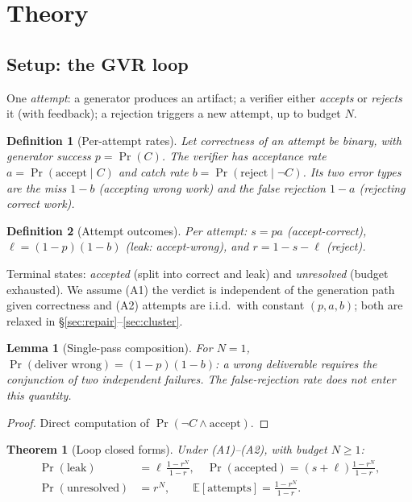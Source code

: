 \documentclass[11pt]{article}
\newtheorem{theorem}{Theorem}
\newtheorem{lemma}{Lemma}
\newtheorem{definition}{Definition}
\begin{document}
\section{Theory}\label{sec:theory}

\subsection{Setup: the GVR loop}\label{sec:setup}

One \emph{attempt}: a generator produces an artifact; a verifier
either \emph{accepts} or \emph{rejects} it (with feedback); a
rejection triggers a new attempt, up to budget $N$.

\begin{definition}[Per-attempt rates]\label{def:rates}
Let correctness of an attempt be binary, with generator success
$p = \Pr(C)$.  The verifier has acceptance rate
$a = \Pr(\text{accept} \mid C)$ and catch rate
$b = \Pr(\text{reject} \mid \neg C)$.  Its two error types are the
\emph{miss} $1-b$ (accepting wrong work) and the \emph{false
rejection} $1-a$ (rejecting correct work).
\end{definition}

\begin{definition}[Attempt outcomes]\label{def:outcomes}
Per attempt: $s = pa$ (accept-correct),
$\ell = (1-p)(1-b)$ (\emph{leak}: accept-wrong), and
$r = 1 - s - \ell$ (reject).
\end{definition}

Terminal states: \emph{accepted} (split into correct and leak) and
\emph{unresolved} (budget exhausted).  We assume (A1) the verdict is
independent of the generation path given correctness and (A2)
attempts are i.i.d.\ with constant $(p,a,b)$; both are relaxed in
§\ref{sec:repair}--\ref{sec:cluster}.

\begin{lemma}[Single-pass composition]\label{lem:single}
For $N=1$, $\Pr(\text{deliver wrong}) = (1-p)(1-b)$: a wrong
deliverable requires the conjunction of two independent failures.
The false-rejection rate does not enter this quantity.
\end{lemma}

\begin{proof}
Direct computation of $\Pr(\neg C \wedge \text{accept})$.
\end{proof}

\begin{theorem}[Loop closed forms]\label{thm:loop}
Under (A1)--(A2), with budget $N \ge 1$:
\begin{align}
\Pr(\text{leak}) &= \ell\,\frac{1-r^N}{1-r}, \quad
\Pr(\text{accepted}) = (s+\ell)\frac{1-r^N}{1-r},\\
\Pr(\text{unresolved}) &= r^N, \qquad
\mathbb{E}[\text{attempts}] = \frac{1-r^N}{1-r}.
\end{align}
\end{theorem}
\end{document}
